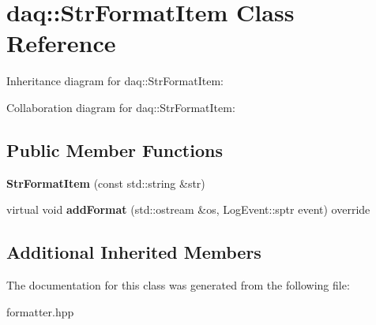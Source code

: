 \hypertarget{classdaq_1_1StrFormatItem}{}\section{daq\+:\+:Str\+Format\+Item Class Reference}
\label{classdaq_1_1StrFormatItem}


Inheritance diagram for daq\+:\+:Str\+Format\+Item\+:


Collaboration diagram for daq\+:\+:Str\+Format\+Item\+:
\subsection*{Public Member Functions}
\begin{DoxyCompactItemize}
\item 
\mbox{\label{classdaq_1_1StrFormatItem_a3fea1731a7cffeb56d18cb93f4080b81}} 
{\bfseries Str\+Format\+Item} (const std\+::string \&str)
\item 
\mbox{\label{classdaq_1_1StrFormatItem_a374643fcbf325e35bb25cae833a259d6}} 
virtual void {\bfseries add\+Format} (std\+::ostream \&os, Log\+Event\+::sptr event) override
\end{DoxyCompactItemize}
\subsection*{Additional Inherited Members}


The documentation for this class was generated from the following file\+:\begin{DoxyCompactItemize}
\item 
formatter.\+hpp\end{DoxyCompactItemize}
